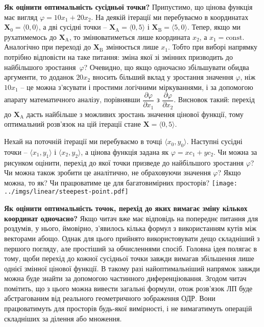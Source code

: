 \documentclass[\main/book.tex]{subfiles}
\begin{document}
\textbf{Як оцінити оптимальність сусідньої точки?} \quad Припустимо, що цінова функція має вигляд $\varphi = 10 x_1 + 20 x_2$. На деякій ітерації ми перебуваємо в координатах $\mathbf{X}_0 = \langle 0, 0 \rangle$, а дві сусідні точки -- ${\mathbf{X}_\mathrm{A} = \langle 0, 5 \rangle}$ і ${\mathbf{X}_\mathrm{B} = \langle 5, 0 \rangle}$. Тепер, якщо ми рухатимемось до $\mathbf{X}_\mathrm{A}$, то змінюватиметься лише координата $x_2$, а $x_1=\mathrm{const}$. Аналогічно при переході до $\mathbf{X}_\mathrm{B}$ змінюється лише $x_1$. Тобто при виборі напрямку потрібно відповісти на таке питання: зміна якої зі змінних призводить до найбільшого зростання~$\varphi$? Очевидно, що якщо одночасно збільшувати обидва аргументи, то доданок $20x_2$ вносить більший вклад у зростання значення $\varphi$, ніж $10x_1$ -- це можна з'ясувати і простими логічними міркуваннями, і за допомогою апарату математичного аналізу, порівнявши $\dfrac{\partial \varphi}{\partial x_1}$ з $\dfrac{\partial \varphi}{\partial x_2}$. Висновок такий: перехід до $\mathbf{X}_\mathrm{A}$ дасть найбільше з можливих зростань значення цінової функції, тому оптимальний розв'язок на цій ітерації стане $\mathbf{X} = \langle 0, 5 \rangle$.

\begin{question}
 Нехай на поточній ітерації ми перебуваємо в точці $\langle x_0, y_0 \rangle$. Наступні сусідні точки -- $\langle x_1, y_1 \rangle$ і $\langle x_2, y_2 \rangle$, а цінова функція задана як $\varphi = x c_1 + y c_2$. Чи можна за рисунком оцінити, перехід до якої точки призведе до найбільшого зростання $\varphi$? Чи можна також зробити це аналітично, не обраховуючи значення $\varphi$? Якщо можна, то як? Чи працюватиме це для багатовимірних просторів?
 \center
 \texttt{[image: ../imgs/linear/steepest-point.pdf]}
\end{question}

\textbf{Як оцінити оптимальність точок, перехід до яких вимагає зміну кількох координат одночасно?} \quad Якщо читач вже має відповідь на попереднє питання для роздумів, у нього, ймовірно, з'явилось кілька формул з використанням кутів між векторами абощо. Однак для цього прийнято використовувати дещо складніший з першого погляду, але простіший за обчисленнями спосіб. Головна ідея полягає в тому, щоби перехід до кожної сусідньої точки завжди вимагав збільшення лише однієї змінної цінової функції. В такому разі найоптимальніший напрямок завжди можна буде знайти за допомогою частинного диференціювання. Згодом читач помітить, що з цього можна вивести загальні формули, отож розв'язок ЛП буде абстрагованим від реального геометричного зображення ОДР. Вони працюватимуть для просторів будь-якої вимірності, і не вимагатимуть операцій складніших за ділення або множення.
\noclub
\end{document}
